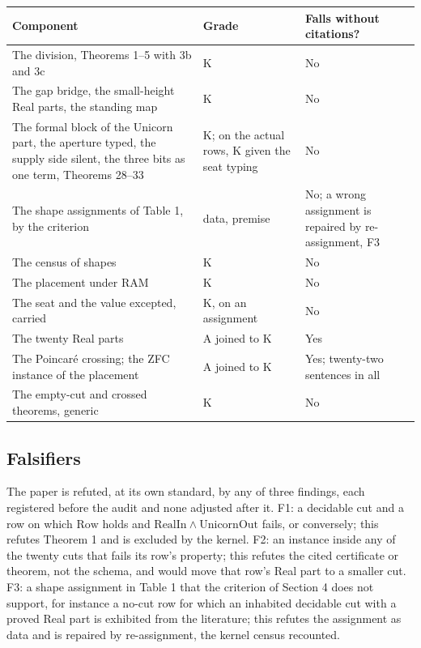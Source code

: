 \documentclass[10pt,twocolumn]{article}
\begin{document}
\begin{table}[!h]
\centering\scriptsize
\renewcommand{\arraystretch}{1.15}
\begin{tabularx}{\columnwidth}{@{}L P{0.19\columnwidth} P{0.22\columnwidth}@{}}
\toprule
\textbf{Component} & \textbf{Grade} & \textbf{Falls without citations?} \\
\midrule
The division, Theorems 1--5 with 3b and 3c & K & No \\
The gap bridge, the small-height Real parts, the standing map & K & No \\
The formal block of the Unicorn part, the aperture typed, the supply side silent, the three bits as one term, Theorems 28--33 & K; on the actual rows, K given the seat typing & No \\
The shape assignments of Table 1, by the criterion & data, premise & No; a wrong assignment is repaired by re-assignment, F3 \\
The census of shapes & K & No \\
The placement under RAM & K & No \\
The seat and the value excepted, carried & K, on an assignment & No \\
The twenty Real parts & A joined to K & Yes \\
The Poincaré crossing; the ZFC instance of the placement & A joined to K & Yes; twenty-two sentences in all \\
The empty-cut and crossed theorems, generic & K & No \\
\bottomrule
\end{tabularx}
\end{table}

\hypertarget{falsifiers}{%
\subsection{Falsifiers}\label{falsifiers}}

The paper is refuted, at its own standard, by any of three findings,
each registered before the audit and none adjusted after it. F1: a
decidable cut and a row on which \(\mathrm{Row}\) holds and
\(\mathrm{RealIn} \wedge \mathrm{UnicornOut}\) fails, or conversely;
this refutes Theorem 1 and is excluded by the kernel. F2: an instance
inside any of the twenty cuts that fails its row's property; this
refutes the cited certificate or theorem, not the schema, and would move
that row's Real part to a smaller cut. F3: a shape assignment in Table 1
that the criterion of Section 4 does not support, for instance a no-cut
row for which an inhabited decidable cut with a proved Real part is
exhibited from the literature; this refutes the assignment as data and
is repaired by re-assignment, the kernel census recounted.
\end{document}
